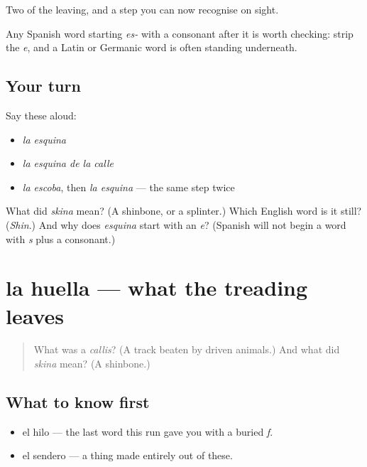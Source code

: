 \begin{grammarlens}[title={What you've built}]
Two of the leaving, and a step you can now recognise on sight.

Any Spanish word starting \emph{es-} with a consonant after it is worth checking: strip the \emph{e}, and a Latin or Germanic word is often standing underneath.
\end{grammarlens}

\subsection*{Your turn}
Say these aloud:

\begin{itemize}
\raggedright
  \item \emph{la esquina}
  \item \emph{la esquina de la calle}
  \item \emph{la escoba}, then \emph{la esquina} — the same step twice
\end{itemize}

\begin{tcolorbox}[breakable,colback=teal!4,colframe=teal!35!black,title={Before you move on}]
What did \emph{skina} mean? (A shinbone, or a splinter.) Which English word is it still? (\emph{Shin}.) And why does \emph{esquina} start with an \emph{e}? (Spanish will not begin a word with \emph{s} plus a consonant.)
\end{tcolorbox}
\section[la huella]{la huella — what the treading leaves}

\label{lesson:ES-C302-huella}



\begin{quote}
What was a \emph{callis}? (A track beaten by driven animals.) And what did \emph{skina} mean? (A shinbone.)
\end{quote}

\subsection*{What to know first}
\begin{itemize}
\raggedright
  \item el hilo — the last word this run gave you with a buried \emph{f}.
  \item el sendero — a thing made entirely out of these.
\end{itemize}

